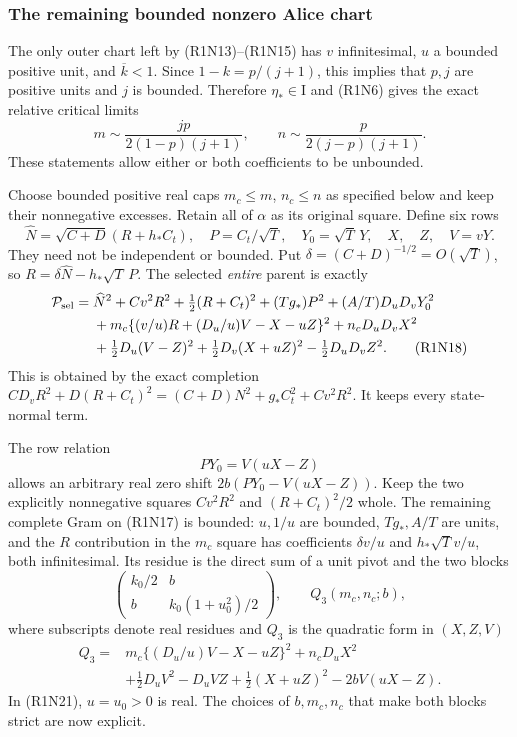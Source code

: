 \subsubsection*{The remaining bounded nonzero Alice chart}

The only outer chart left by (R1N13)--(R1N15) has $v$ infinitesimal,
$u$ a bounded positive unit, and $\overline k<1$.  Since
$1-k=p/(j+1)$, this implies that $p,j$ are positive units and $j$
is bounded.  Therefore $\eta_*\in\mathrm I$ and (R1N6) gives the
exact relative critical limits
\[
 m\sim\frac{jp}{2(1-p)(j+1)},\qquad
 n\sim\frac{p}{2(j-p)(j+1)}.                              \tag{R1N16}
\]
These statements allow either or both coefficients to be unbounded.

Choose bounded positive real caps $m_c\le m$, $n_c\le n$ as specified
below and keep their nonnegative excesses.  Retain all of $\alpha$
as its original square.  Define six rows
\[
 \widehat N=\sqrt{C+D}(R+h_*C_t),\quad
 P=C_t/\sqrt T,\quad Y_0=\sqrt T\,Y,\quad
 X,\quad Z,\quad V=vY.                                  \tag{R1N17}
\]
They need not be independent or bounded.  Put
$\delta=(C+D)^{-1/2}=O(\sqrt T)$, so
$R=\delta\widehat N-h_*\sqrt T\,P$.
The selected \emph{entire} parent is exactly
\begin{align*}
 \mathcal P_{\rm sel}={}&
 \widehat N^2+Cv^2R^2+\tfrac12(R+C_t)^2
       +(Tg_*)P^2+(A/T)D_uD_vY_0^2\\
 &+m_c\{(v/u)R+(D_u/u)V-X-uZ\}^2+n_cD_uD_vX^2\\
 &+\tfrac12D_u(V-Z)^2+\tfrac12D_v(X+uZ)^2
                                      -\tfrac12D_uD_vZ^2 .
\tag{R1N18}
\end{align*}
This is obtained by the exact completion
$CD_vR^2+D(R+C_t)^2=(C+D)N^2+g_*C_t^2+Cv^2R^2$.
It keeps every state-normal term.

The row relation
\[
 PY_0=V(uX-Z)                                            \tag{R1N19}
\]
allows an arbitrary real zero shift
$2b(PY_0-V(uX-Z))$.  Keep the two explicitly nonnegative squares
$Cv^2R^2$ and $(R+C_t)^2/2$ whole.  The remaining complete Gram
on (R1N17) is bounded: $u,1/u$ are bounded, $Tg_*,A/T$ are
units, and the $R$ contribution in the $m_c$ square has coefficients
$\delta v/u$ and $h_*\sqrt T v/u$, both infinitesimal.
Its residue is the direct sum of a unit pivot and the two blocks
\[
 \begin{pmatrix}k_0/2&b\\b&k_0(1+u_0^2)/2\end{pmatrix},\qquad
 Q_3(m_c,n_c;b),                                        \tag{R1N20}
\]
where subscripts denote real residues and $Q_3$ is the quadratic
form in $(X,Z,V)$
\begin{align*}
 Q_3={}&m_c\{(D_u/u)V-X-uZ\}^2+n_cD_uX^2\\
       &+\tfrac12D_uV^2-D_uVZ+\tfrac12(X+uZ)^2
                                            -2bV(uX-Z).
\tag{R1N21}
\end{align*}
In (R1N21), $u=u_0>0$ is real.  The choices of $b,m_c,n_c$
that make both blocks strict are now explicit.


